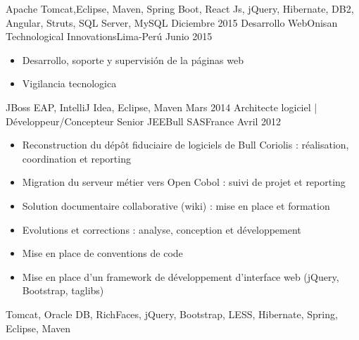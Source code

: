 \begin{experiences}
{\begin{itemize}
                        
                      \end{itemize}
                    }
                    {Apache Tomcat,Eclipse, Maven, Spring Boot, React Js, jQuery, Hibernate, DB2, Angular, Struts, SQL Server, MySQL}
  \emptySeparator
  \experience
    {Diciembre 2015} {Desarrollo Web}{Onisan Technological Innovations}{Lima-Perú}
    {Junio 2015}    {
                      \begin{itemize}
                        \item Desarrollo, soporte y supervisión de la páginas web
                        \item Vigilancia tecnologica                                                                    
                      \end{itemize}
                    }
                    {JBoss EAP, IntelliJ Idea, Eclipse, Maven}
  \emptySeparator
  \experience
    {Mars 2014}     {Architecte logiciel | Développeur/Concepteur Senior JEE}{Bull SAS}{France}
    {Avril 2012}    {
                      \begin{itemize}
                        \item Reconstruction du dépôt fiduciaire de logiciels de Bull Coriolis : réalisation, coordination et reporting
                        \item Migration du serveur métier vers Open Cobol : suivi de projet et reporting                
                        \item Solution documentaire collaborative (wiki) : mise en place et formation                   
                        \item Evolutions et corrections : analyse, conception et développement                          
                        \item Mise en place de conventions de code                                                      
                        \item Mise en place d'un framework de développement d'interface web (jQuery, Bootstrap, taglibs)
                      \end{itemize}
                    }
                    {Tomcat, Oracle DB, RichFaces, jQuery, Bootstrap, LESS, Hibernate, Spring, Eclipse, Maven}
  
\end{experiences}
